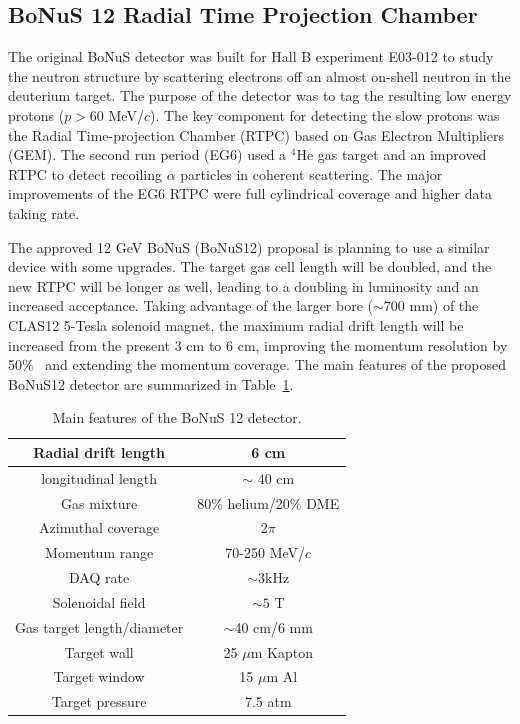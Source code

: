 \subsection{BoNuS 12 Radial Time Projection Chamber}
The original BoNuS detector was built for Hall B experiment E03-012 to study the neutron structure by scattering electrons off an almost on-shell neutron in the deuterium target. The purpose of the detector was to tag the resulting low energy protons ($p>60$ MeV/$c$). The key component for detecting the slow protons was the Radial Time-projection Chamber (RTPC) based on Gas Electron Multipliers (GEM). The second run period (EG6) used a $^4$He gas target and an improved RTPC to detect recoiling $\alpha$ particles in coherent scattering. The major improvements of the EG6 RTPC were full cylindrical coverage and higher data taking rate.

The approved 12 GeV BoNuS (BoNuS12) proposal is planning to use a similar device with some upgrades. The target gas cell length will be doubled, and the new RTPC will be longer as well, leading to a doubling in luminosity and an increased acceptance. Taking advantage of the larger bore ($\sim 700$ mm) of the CLAS12 5-Tesla solenoid magnet, the maximum radial drift length will be increased from the present 3 cm to 6 cm, improving the momentum resolution by 50\%~\cite{bonus12} and extending the momentum coverage. The main features of the proposed BoNuS12 detector are summarized in Table~\ref{tab:bonus}.

\begin{table}
\caption{\label{tab:bonus}Main features of the BoNuS 12 detector.}
\begin{tabular}{|c|c|}
\hline
Radial drift length & 6 cm\\
\hline
longitudinal length & $\sim$ 40 cm\\
\hline
Gas mixture & 80\% helium/20\% DME\\
\hline
Azimuthal coverage & 2$\pi$\\
\hline
Momentum range & 70-250 MeV/$c$\\
\hline
DAQ rate & $\sim 3$kHz\\
\hline
Solenoidal field & $\sim 5$ T\\
\hline
Gas target length/diameter & $\sim$40 cm/6 mm\\
\hline
Target wall & 25 $\mu$m Kapton\\
\hline
Target window & 15 $\mu$m Al\\
\hline
Target pressure & 7.5 atm\\
\hline
\end{tabular}
\end{table}

